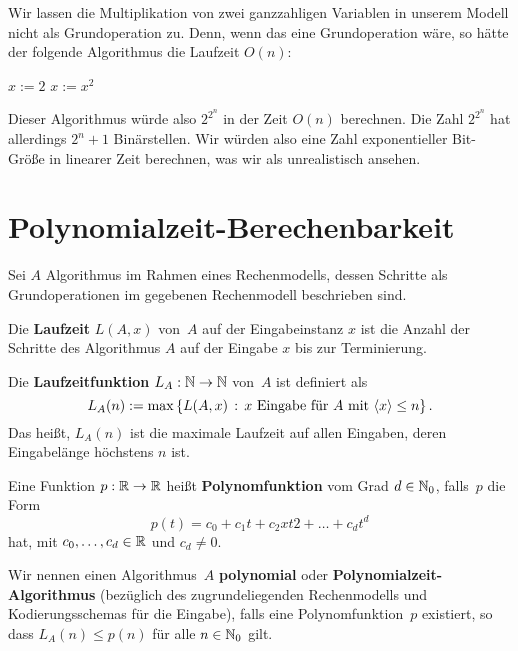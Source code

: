 \begin{bem} 
Wir lassen die Multiplikation von zwei ganzzahligen Variablen in unserem Modell nicht als Grundoperation zu. Denn, wenn das eine Grundoperation wäre, so hätte der folgende Algorithmus die Laufzeit $O(n)$: 

\begin{center}
	\begin{algorithmic}
		\STATE $x:=2$
		\STATE $x:=x^2$
		\ENDFOR
	\end{algorithmic}
\end{center}

Dieser Algorithmus würde also $2^{2^n}$ in der Zeit $O(n)$ berechnen. Die Zahl $2^{2^n}$ hat allerdings $2^n+1$ Binärstellen. Wir würden also eine Zahl exponentieller Bit-Größe in linearer Zeit berechnen, was wir als unrealistisch ansehen. 
\end{bem}

\section{Polynomialzeit-Berechenbarkeit} 



\begin{defn} 
	Sei $A$ Algorithmus im Rahmen eines Rechenmodells, dessen Schritte als Grundoperationen im gegebenen Rechenmodell beschrieben sind. 

Die \textbf{Laufzeit} $L(A,x)$ von~$A$ auf der Eingabeinstanz $x$ ist die Anzahl der Schritte des Algorithmus $A$ auf der Eingabe $x$ bis zur Terminierung. 

Die \textbf{Laufzeitfunktion} $L_A : \mathbb{N} \to \mathbb{N}$ von~$A$ ist definiert als
\[
L_A(n) := \max \left\{   L(A,x)  \,:\, x \ \text{Eingabe für} \ A  \ \text{mit} \ \langle x \rangle \le n \right\}.
\]
Das heißt, $L_A(n)$ ist die maximale Laufzeit auf allen Eingaben, deren Eingabelänge höchstens $n$ ist. 
\end{defn} 

\begin{defn}
	Eine Funktion $p : \mathbb{R} \to \mathbb{R}$ heißt \textbf{Polynomfunktion} vom Grad $d \in \mathbb{N}_0$, falls~$p$ die Form \[
		p(t)= c_0 + c_1 t + c_2 xt2 + \ldots + c_d t^d
	\]
	hat, mit $c_0,\ldots,c_d \in \mathbb{R}$ und $c_d \ne 0$. 
\end{defn} 

\begin{defn} 
Wir nennen einen Algorithmus~$A$ \textbf{polynomial} oder \textbf{Polynomialzeit-Algorithmus} (bezüglich des zugrundeliegenden Rechenmodells und Kodierungsschemas für die Eingabe), falls eine Polynomfunktion~$p$ existiert, so dass $L_A(n) \leq p(n)$ für alle $n \in \mathbb{N}_0$ gilt.
\end{defn} 

